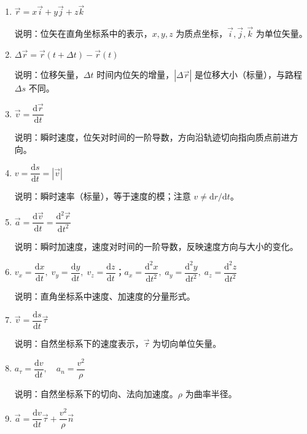 \documentclass[12pt,a4paper]{ctexart}
\begin{document}
\begin{enumerate}[leftmargin=3em,label=\textbf{公式\arabic*}：,ref=公式\arabic*]

    \item $\vec{r} = x\vec{i} + y\vec{j} + z\vec{k}$

    说明：位矢在直角坐标系中的表示，$x,y,z$ 为质点坐标，$\vec{i},\vec{j},\vec{k}$ 为单位矢量。

    \item $\Delta\vec{r} = \vec{r}(t+\Delta t) - \vec{r}(t)$

    说明：位移矢量，$\Delta t$ 时间内位矢的增量，$|\Delta\vec{r}|$ 是位移大小（标量），与路程 $\Delta s$ 不同。

    \item $\vec{v} = \dfrac{\mathrm{d}\vec{r}}{\mathrm{d}t}$

    说明：瞬时速度，位矢对时间的一阶导数，方向沿轨迹切向指向质点前进方向。

    \item $v = \dfrac{\mathrm{d}s}{\mathrm{d}t} = |\vec{v}|$

    说明：瞬时速率（标量），等于速度的模；注意 $v \ne \mathrm{d}r/\mathrm{d}t$。

    \item $\vec{a} = \dfrac{\mathrm{d}\vec{v}}{\mathrm{d}t} = \dfrac{\mathrm{d}^2\vec{r}}{\mathrm{d}t^2}$

    说明：瞬时加速度，速度对时间的一阶导数，反映速度方向与大小的变化。

    \item $v_x = \dfrac{\mathrm{d}x}{\mathrm{d}t},\; v_y = \dfrac{\mathrm{d}y}{\mathrm{d}t},\; v_z = \dfrac{\mathrm{d}z}{\mathrm{d}t}$；$a_x = \dfrac{\mathrm{d}^2x}{\mathrm{d}t^2},\; a_y = \dfrac{\mathrm{d}^2y}{\mathrm{d}t^2},\; a_z = \dfrac{\mathrm{d}^2z}{\mathrm{d}t^2}$

    说明：直角坐标系中速度、加速度的分量形式。

    \item $\vec{v} = \dfrac{\mathrm{d}s}{\mathrm{d}t}\vec{\tau}$

    说明：自然坐标系下的速度表示，$\vec{\tau}$ 为切向单位矢量。

    \item $a_\tau = \dfrac{\mathrm{d}v}{\mathrm{d}t},\quad a_n = \dfrac{v^2}{\rho}$

    说明：自然坐标系下的切向、法向加速度。$\rho$ 为曲率半径。

    \item $\vec{a} = \dfrac{\mathrm{d}v}{\mathrm{d}t}\vec{\tau} + \dfrac{v^2}{\rho}\vec{n}$


\end{enumerate}
\end{document}
